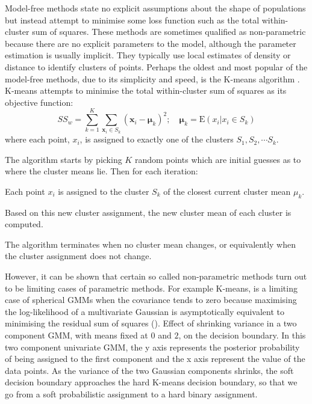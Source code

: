 Model-free methods state no explicit assumptions about the shape of populations but instead
attempt to minimise some loss function such as the total within-cluster sum of squares.
These methods are sometimes qualified as non-parametric because there are no explicit parameters to the model,
although the parameter estimation is usually implicit.
They typically use local estimates of density or distance to identify clusters of points.
Perhaps the oldest and most popular of the model-free methods, due to its simplicity and speed, is the K-means algorithm \citep{MacQueen:1967uv}.
K-means attempts to minimise the total within-cluster sum of squares as its objective function:
\begin{equation}
\label{equation:ssw}
SS_{w} = \sum_{k=1}^{K} \sum_{\mathbf x_i \in S_k} ( \mathbf x_i - \boldsymbol\mu_k )^2 ; \quad \boldsymbol\mu_k=\text{E}(x_i| x_i \in S_k)
\end{equation}
where each point, $x_i$, is assigned to exactly one of the clusters $S_1, S_2, \cdots S_k$.

The algorithm starts by picking $K$ random points which are initial guesses as to where the cluster means lie.
Then for each iteration:
\begin{itemise}
    \item Each point $x_i$ is assigned to the cluster $S_k$ of the closest current cluster mean $\mu_k$.
    \item Based on this new cluster assignment, the new cluster mean of each cluster is computed.
\end{itemise}
The algorithm terminates when no cluster mean changes, or equivalently when the cluster assignment does not change.

However, it can be shown that certain so called non-parametric methods turn out to be limiting cases of parametric methods.
For example K-means, is a limiting case of spherical \glspl{GMM} when the covariance tends to zero
because maximising the log-likelihood of a multivariate Gaussian is asymptotically equivalent to minimising the residual sum of squares ().
{ Effect of shrinking variance in a two component \gls{GMM}, with means fixed at $0$ and $2$, on the decision boundary. }
{
  In this two component univariate \gls{GMM}, the y axis represents the posterior probability of being assigned to the first component and
  the x axis represent the value of the data points.
  As the variance of the two Gaussian components shrinks, the soft decision boundary approaches the hard K-means decision boundary, so that we go from
  a soft probabilistic assignment to a hard binary assignment. 
}

